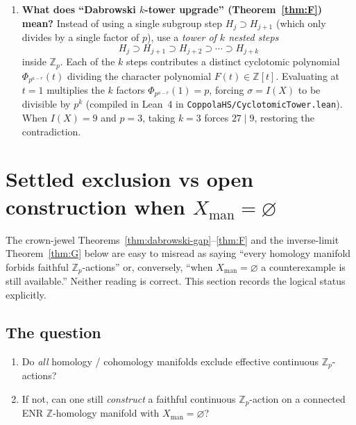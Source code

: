 \documentclass[11pt]{article}
\theoremstyle{definition}
\begin{document}
\begin{enumerate}[label=\textbf{\arabic*.}]
\emph{ENR} (a retract of a finite polyhedron $B$), the pushed-forward sheaf
complex from $\widehat{M}$ is a direct summand of the pushforward from $B$, so
it automatically lies in OpenAI's idempotent-complete test category
$\mathcal{T}(S^d)$ on the target sphere without needing a chart or a
triangulation.  Instead of dividing $4$ into $p^k$ equal parts, one divides
$4\,I(X)$ into $p^k$ equal parts in a fixed denominator lattice
$L_d^{-1}\mathbb{Z}$.  Because $k$ can be chosen arbitrarily large
($p^k>4|I(X)|L_d$), this kills \emph{every} $I(X)\neq 0$, even when
$p\mid I(X)$.
\item \textbf{What does ``Dabrowski $k$-tower upgrade'' (Theorem~\ref{thm:F})
mean?}
Instead of using a single subgroup step $H_j\supset H_{j+1}$ (which only divides
by a single factor of $p$), use a \emph{tower of $k$ nested steps}
\[
H_j\supset H_{j+1}\supset H_{j+2}\supset\cdots\supset H_{j+k}
\]
inside $\mathbb{Z}_p$.  Each of the $k$ steps contributes a distinct
cyclotomic polynomial $\Phi_{p^{a-r}}(t)$ dividing the character polynomial
$F(t)\in\mathbb{Z}[t]$.  Evaluating at $t=1$ multiplies the $k$ factors
$\Phi_{p^{a-r}}(1)=p$, forcing $\sigma=I(X)$ to be divisible by $p^k$
(compiled in Lean~4 in \texttt{CoppolaHS/CyclotomicTower.lean}).  When
$I(X)=9$ and $p=3$, taking $k=3$ forces $27\mid 9$, restoring the
contradiction.
\end{enumerate}

\section{Settled exclusion vs open construction when $X_{\mathrm{man}}=\varnothing$}
\label{sec:compare}

The crown-jewel Theorems~\ref{thm:dabrowski-gap}--\ref{thm:F} and the
inverse-limit Theorem~\ref{thm:G} below are easy to misread as saying
``every homology manifold forbids faithful $\mathbb{Z}_p$-actions'' or,
conversely, ``when $X_{\mathrm{man}}=\varnothing$ a counterexample is still
available.''  Neither reading is correct.  This section records the logical
status explicitly.

\subsection{The question}
\label{sec:settled-question}

\begin{enumerate}[label=\textbf{Q\arabic*.}]
\item Do \emph{all} homology / cohomology manifolds exclude effective continuous
$\mathbb{Z}_p$-actions?
\item If not, can one still \emph{construct} a faithful continuous
$\mathbb{Z}_p$-action on a connected ENR $\mathbb{Z}$-homology manifold with
$X_{\mathrm{man}}=\varnothing$?
\end{enumerate}
\end{document}
